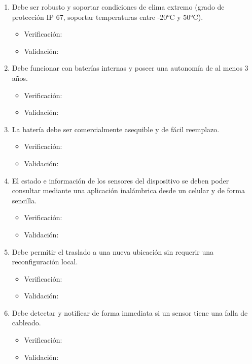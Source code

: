 \documentclass[
11pt, %
]{charter}
\begin{document}
\begin{enumerate}
\begin{enumerate}
			\item Debe ser robusto y soportar condiciones de clima extremo (grado de protección IP 67, soportar temperaturas entre -20°C y 50°C).
			\begin{itemize}
				\item Verificación:
				\item Validación: 
			\end{itemize}
			\item Debe funcionar con baterías internas y poseer una autonomía de al menos 3 años.
			\begin{itemize}
				\item Verificación:
				\item Validación: 
			\end{itemize}
			\item La batería debe ser comercialmente asequible y de fácil reemplazo.
			\begin{itemize}
				\item Verificación:
				\item Validación: 
			\end{itemize}
			\item El estado e información de los sensores del dispositivo se deben poder consultar mediante una aplicación inalámbrica desde un celular y de forma sencilla.
			\begin{itemize}
				\item Verificación:
				\item Validación: 
			\end{itemize}
			\item Debe permitir el traslado a una nueva ubicación sin requerir una reconfiguración local.
			\begin{itemize}
				\item Verificación:
				\item Validación: 
			\end{itemize}
			\item Debe detectar y notificar de forma inmediata si un sensor tiene una falla de cableado.
			\begin{itemize}
				\item Verificación:
				\item Validación: 
			\end{itemize}
		\end{enumerate}
		

\end{enumerate}
\end{document}
